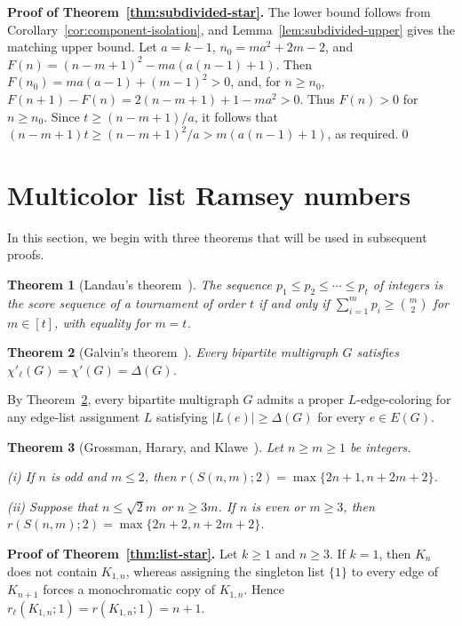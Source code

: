 \documentclass[11pt]{article}
\newtheorem{theorem}{Theorem}[section]
\theoremstyle{definition}
\theoremstyle{remark}
\begin{document}
\textbf{Proof of Theorem~\ref{thm:subdivided-star}.}
The lower bound follows from Corollary~\ref{cor:component-isolation},
and Lemma~\ref{lem:subdivided-upper} gives the matching upper bound.
Let \(a=k-1\),
\(n_0=ma^2+2m-2\), and
\(F(n)=(n-m+1)^2-ma(a(n-1)+1)\). Then
\(F(n_0)=ma(a-1)+(m-1)^2>0\), and, for \(n\ge n_0\),
\(F(n+1)-F(n)=2(n-m+1)+1-ma^2>0\). Thus \(F(n)>0\) for
\(n\ge n_0\). Since \(t\ge(n-m+1)/a\), it follows that
\((n-m+1)t\ge(n-m+1)^2/a>m(a(n-1)+1)\), as required.\qed

\section{Multicolor list Ramsey numbers}
In this section, we begin with three theorems that will be used in subsequent proofs.
\begin{theorem}[Landau's theorem~\cite{Landau}]\label{thm:landau}
The sequence \(p_1\leq p_2\leq\cdots\leq p_t\) of integers is the score sequence of a tournament of order \(t\) if and only if \(\sum_{i=1}^m p_i\ge\binom m2\) for $m\in[t]$, with equality for \(m=t\).
\end{theorem}

\begin{theorem}[Galvin's theorem~\cite{Galvin}]\label{thm:galvin}
Every bipartite multigraph \(G\) satisfies $\chi'_{\ell}(G)=\chi'(G)=\Delta(G)$.
\end{theorem}
\noindent
By Theorem~\ref{thm:galvin}, every bipartite multigraph \(G\) admits a proper \(L\)-edge-coloring for any edge-list assignment \(L\) satisfying $|L(e)|\geq\Delta(G)$ for every $e\in E(G)$.

\begin{theorem}[Grossman, Harary, and Klawe~\cite{GrossmanEtAl}]
\label{thm:ghk-double-star}
Let \(n\ge m\ge1\) be integers.

\noindent
\textup{(i)} If \(n\) is odd and \(m\le2\), then
\(r(S(n,m);2)=\max\{2n+1,n+2m+2\}\).

\noindent
\textup{(ii)} Suppose that \(n\le\sqrt{2}m\) or \(n\ge3m\).
If \(n\) is even or \(m\ge3\), then
\(r(S(n,m);2)=\max\{2n+2,n+2m+2\}\).
\end{theorem}

\textbf{Proof of Theorem~\ref{thm:list-star}.}
Let \(k\geq1\) and \(n\geq3\). If \(k=1\), then \(K_n\) does not
contain \(K_{1,n}\), whereas assigning the singleton list \(\{1\}\) to
every edge of \(K_{n+1}\) forces a monochromatic copy of \(K_{1,n}\).
Hence \(r_{\ell}(K_{1,n};1)=r(K_{1,n};1)=n+1\).
\end{document}
